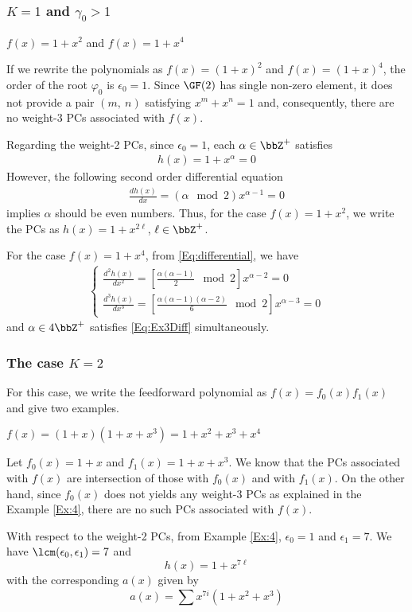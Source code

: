 \subsubsection{$K=1$ and $\gamma_0 > 1$}
\begin{example}
	$f(x)=1+x^2$ and $f(x)=1+x^4$\newline
	
	If we rewrite the polynomials as $f(x)=(1+x)^2$ and $f(x)=(1+x)^4$,	the order of the root $\varphi_0$ is $\epsilon_0=1$. Since $\GF(2)$ has single non-zero element, it does not provide a pair $(m,~n)$ satisfying $x^m+x^n = 1$ and, consequently, there are no weight-3 PCs associated with $f(x)$.
	
	Regarding the weight-2 PCs, since $\epsilon_0 = 1$, each $\alpha \in \bbZ^+$ satisfies
	\begin{align}
		h(x) = 1+x^\alpha = 0
	\end{align}
	However, the following second order differential equation
	\begin{align}
	\frac{dh(x)}{dx} = (\alpha\mod 2) x^{\alpha-1} = 0
	\end{align}
	implies $\alpha$ should be even numbers. Thus, for the case $f(x) = 1+x^2$, we write the PCs as  $h(x)=1+x^{2\ell}$, $\ell \in \bbZ^+$.
	

	For the case $f(x) = 1+x^4$, from \eqref{Eq:differential}, we have
	\begin{align}
		\begin{cases}
		\frac{d^2h(x)}{dx^2} = \left[\frac{\alpha(\alpha-1)}{2} \mod 2\right]x^{\alpha-2} = 0 \\
		\frac{d^3h(x)}{dx^3} = \left[\frac{\alpha(\alpha-1)(\alpha-2)}{6} \mod 2\right]x^{\alpha-3} = 0
		\end{cases}
		\label{Eq:Ex3Diff}
	\end{align}
	and $\alpha \in 4\bbZ^+$ satisfies \eqref{Eq:Ex3Diff} simultaneously.
\label{Ex:4}
\end{example}

\subsubsection{The case $K=2$}

For this case, we write the feedforward polynomial as $f(x) =f_0(x)f_1(x)$ and give two examples.
\begin{example}
	$f(x)= (1+x)(1+x+x^3)=1+x^2+x^3+x^4$\newline
	
	Let $f_0(x)=1+x$ and $f_1(x)=1+x+x^3$. We know that the PCs  associated with $f(x)$ are intersection of those with $f_0(x)$ and with $f_1(x)$. 
	On the other hand, since $f_0(x)$ does not yields any weight-3 PCs as explained in the Example \ref{Ex:4}, there are no such PCs associated with $f(x)$.
	
	With respect to the weight-2 PCs, from Example \ref{Ex:4}, $\epsilon_0=1$ and $\epsilon_1=7$. We have $\lcm(\epsilon_0,\epsilon_1)=7$ and
	$$h(x) =1+x^{7\ell}$$
	with the corresponding $a(x)$ given by
	$$a(x) = \sum_{}^{}x^{7i}(1+x^2+x^3)$$
	\label{Ex:5}	
\end{example}

